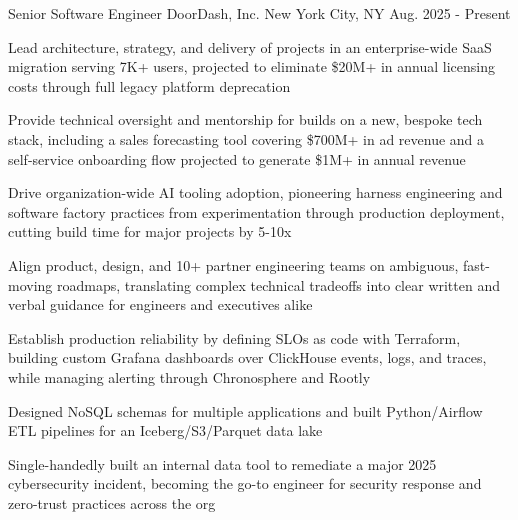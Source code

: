 

\begin{cventries}

  \cventry
    {Senior Software Engineer} %
    {DoorDash, Inc.} %
    {New York City, NY} %
    {Aug. 2025 - Present} %
    {
      \begin{cvitems} 
        \item {Lead architecture, strategy, and delivery of projects in an enterprise-wide SaaS migration serving 7K+ users, projected to eliminate \$20M+ in annual licensing costs through full legacy platform deprecation}
        \item {Provide technical oversight and mentorship for builds on a new, bespoke tech stack, including a sales forecasting tool covering \$700M+ in ad revenue and a self-service onboarding flow projected to generate \$1M+ in annual revenue}
        \item {Drive organization-wide AI tooling adoption, pioneering harness engineering and software factory practices from experimentation through production deployment, cutting build time for major projects by 5-10x}
        \item {Align product, design, and 10+ partner engineering teams on ambiguous, fast-moving roadmaps, translating complex technical tradeoffs into clear written and verbal guidance for engineers and executives alike}
        \item {Establish production reliability by defining SLOs as code with Terraform, building custom Grafana dashboards over ClickHouse events, logs, and traces, while managing alerting through Chronosphere and Rootly}
        \item {Designed NoSQL schemas for multiple applications and built Python/Airflow ETL pipelines for an Iceberg/S3/Parquet data lake}
        \item {Single-handedly built an internal data tool to remediate a major 2025 cybersecurity incident, becoming the go-to engineer for security response and zero-trust practices across the org}
      \end{cvitems}
    }


\end{cventries}
